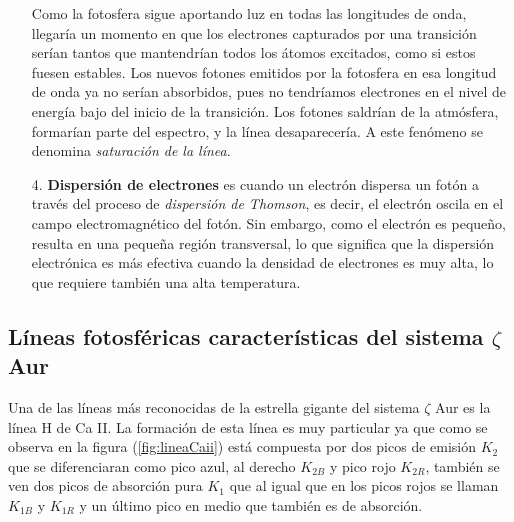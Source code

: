 \documentclass[12pt,oneside,openany,letter]{book}
\begin{document}
\begin{itemize}
    Como la fotosfera sigue aportando luz en todas las longitudes de onda, llegaría un momento en que los electrones capturados por una transición serían tantos que mantendrían todos los átomos excitados, como si estos fuesen estables. Los nuevos fotones emitidos por la fotosfera en esa longitud de onda ya no serían absorbidos, pues no tendríamos electrones en el nivel de energía bajo del inicio de la transición. Los fotones saldrían de la atmósfera, formarían parte del espectro, y la línea desaparecería. A este fenómeno se denomina \textit{saturación de la línea}.

    \item[4.] \textbf{Dispersión de electrones} es cuando un electrón dispersa un fotón a través del proceso de \textit{dispersión de Thomson}, es decir, el electrón oscila en el campo electromagnético del fotón. Sin embargo, como el electrón es pequeño, resulta en una pequeña región transversal, lo que significa que la dispersión electrónica es más efectiva cuando la densidad de electrones es muy alta, lo que requiere también una alta temperatura.
    \end{itemize}
    






\subsection{Líneas fotosféricas características del sistema $\zeta$ Aur}





\noindent Una de las líneas más reconocidas de la estrella gigante del sistema $\zeta$ Aur es la línea H de Ca II. La formación de esta línea es muy particular ya que como se observa en la figura (\ref{fig:lineaCaii}) está compuesta por dos picos de emisión $K_2$ que se diferenciaran como pico azul, al derecho $K_{2B}$ y pico rojo $K_{2R}$, también se ven dos picos de absorción pura $K_1$ que al igual que en los picos rojos se llaman $K_{1B}$ y $K_{1R}$ y un último pico en medio que también es de absorción.
\end{document}
